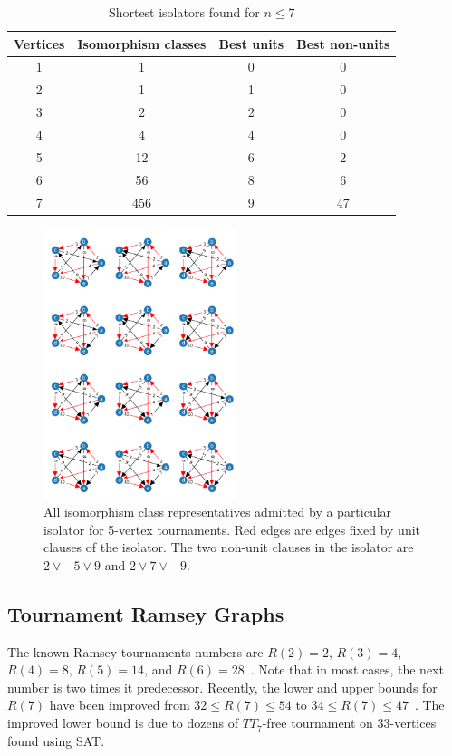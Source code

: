 \documentclass[conference]{IEEEtran}
\begin{document}
\begin{table}[ht]
    \centering
        \caption{Shortest isolators found for $n\le 7$}
    \begin{tabular}{c|c|c|c}
        Vertices & Isomorphism classes &Best units & Best non-units  \\ \hline
        1&1&0&0\\ 
        2&1&1&0\\ 
        3&2&2&0\\ 
        4&4&4&0\\
        5&12&6&2\\ 
        6&56&8&6\\ 
        7&456&9&47\\ 
    \end{tabular}

    \label{tab:smallest_isolators_found}
\end{table}

\begin{figure}
\centering
\includegraphics[width=0.5\textwidth]{iso_5.png}
\caption{All isomorphism class representatives admitted by a particular isolator for 5-vertex tournaments. Red edges are edges fixed by unit clauses of the isolator. The two non-unit clauses in the isolator are $2 \lor -5 \lor 9$ and $2 \lor 7 \lor -9$.} \label{fig2}
\end{figure}

\subsection{Tournament Ramsey Graphs}

The known Ramsey tournaments numbers are $R(2) = 2$, $R(3) = 4$, $R(4) = 8$, $R(5) = 14$, and $R(6) = 28$~\cite{SanchezFlores54}. 
Note that in most cases, the next number is two times it predecessor.
Recently, the lower and upper bounds for $R(7)$ have been improved from $32 \leq R(7) \leq 54$ to $34 \leq R(7) \leq 47$~\cite{directedramsey}. 
The improved lower bound is due to dozens of $TT_7$-free tournament on 33-vertices found using SAT. 
\end{document}
